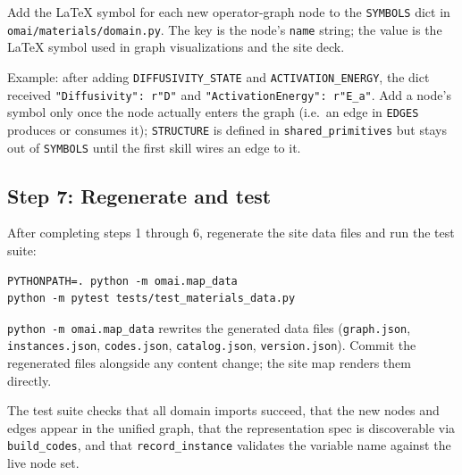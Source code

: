 \documentclass[11pt,a4paper]{article}
\begin{document}
Add the LaTeX symbol for each new operator-graph node to the \texttt{SYMBOLS} dict
in \texttt{omai/materials/domain.py}. The key is the node's \texttt{name} string;
the value is the LaTeX symbol used in graph visualizations and the site deck.

Example: after adding \texttt{DIFFUSIVITY\_STATE} and \texttt{ACTIVATION\_ENERGY},
the dict received \texttt{"Diffusivity": r"D"} and \texttt{"ActivationEnergy":
r"E\_a"}. Add a node's symbol only once the node actually enters the graph (i.e.\
an edge in \texttt{EDGES} produces or consumes it); \texttt{STRUCTURE} is defined in
\texttt{shared\_primitives} but stays out of \texttt{SYMBOLS} until the first skill
wires an edge to it.

\subsection{Step 7: Regenerate and test}

After completing steps 1 through 6, regenerate the site data files and run the test
suite:

\begin{verbatim}
PYTHONPATH=. python -m omai.map_data
python -m pytest tests/test_materials_data.py
\end{verbatim}

\texttt{python -m omai.map\_data} rewrites the generated data files
(\texttt{graph.json}, \texttt{instances.json}, \texttt{codes.json},
\texttt{catalog.json}, \texttt{version.json}). Commit the regenerated files
alongside any content change; the site map renders them directly.

The test suite checks that all domain imports succeed, that the new nodes and edges
appear in the unified graph, that the representation spec is discoverable via
\texttt{build\_codes}, and that \texttt{record\_instance} validates the variable
name against the live node set.
\end{document}
